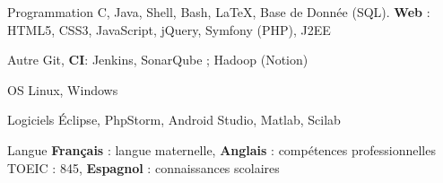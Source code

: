 

\begin{cvskills}

	\cvskill
		{Programmation} %
		{C, Java, Shell, Bash, \LaTeX, Base de Donnée (SQL). \textbf{Web} : HTML5, CSS3, JavaScript, jQuery, Symfony (PHP), J2EE }

	\cvskill
		{Autre} %
		{Git, \textbf{CI}: Jenkins, SonarQube ; Hadoop (Notion)} %

	\cvskill
		{OS} %
		{Linux, Windows} %

	\cvskill
	    {Logiciels} %
	    {Éclipse, PhpStorm, Android Studio, Matlab, Scilab } %

  \cvskill
    {Langue} %
	    {\textbf{Français} : langue maternelle, \textbf{Anglais}  : compétences professionnelles TOEIC : 845, \textbf{Espagnol} : connaissances scolaires} %

\end{cvskills}
